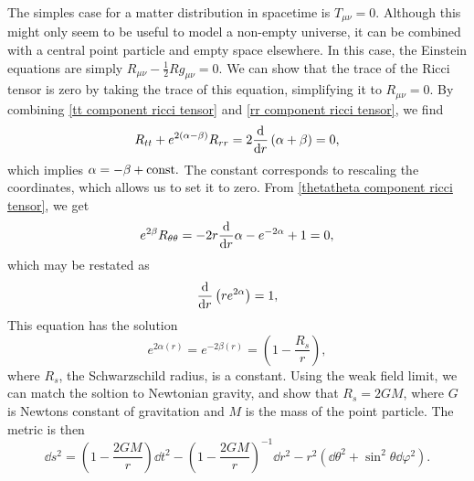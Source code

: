 The simples case for a matter distribution in spacetime is $T_{\mu \nu} = 0$.
Although this might only seem to be useful to model a non-empty universe, it can be combined with a central point particle and empty space elsewhere.
In this case, the Einstein equations are simply $R_{\mu \nu} - \frac{1}{2}R g_{\mu \nu} = 0$.
We can show that the trace of the Ricci tensor is zero by taking the trace of this equation, simplifying it to $R_{\mu \nu} = 0$.
By combining \autoref{tt component ricci tensor} and \autoref{rr component ricci tensor}, we find
%
\begin{equation}
    R_{tt} + e^{2(\alpha - \beta)}R_{rr} = 2 \dv{}{r} \left(\alpha + \beta\right) = 0,
\end{equation}
%
which implies $\alpha = -\beta + \mathrm{const.}$
The constant corresponds to rescaling the coordinates, which allows us to set it to zero.
From \autoref{thetatheta component ricci tensor}, we get
%
\begin{equation}
    e^{2 \beta} R_{\theta \theta} = - 2 r\odv{}{r} \alpha - e^{-2\alpha} + 1 = 0,
\end{equation}
%
which may be restated as
%
\begin{equation}
    \odv{}{r} \left(r e^{2 \alpha}\right) = 1,
\end{equation}
%
This equation has the solution
%
\begin{equation}
    e^{2\alpha(r)} = e^{-2 \beta(r)} = \left( 1- \frac{R_s}{r} \right),
\end{equation}
%
where $R_s$, the Schwarzschild radius, is a constant.
Using the weak field limit, we can match the soltion to Newtonian gravity, and show that $R_s = 2 G M$, where $G$ is Newtons constant of gravitation and $M$ is the mass of the point particle.
The metric is then
%
\begin{equation}
    \label{Schwarzchild metric}
    \dd s^2 
    = 
    \left( 1 - \frac{2 G M}{r} \right) \dd t^2
    -\left( 1 - \frac{2 G M}{r} \right)^{-1} \dd r^2
    - r^2 \left(\dd \theta^2 + \sin^2 \theta \dd \varphi^2\right).
\end{equation}
%





